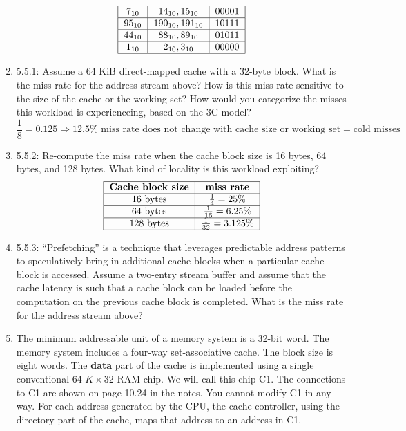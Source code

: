 \documentclass[10pt,letterpaper]{article}
\begin{document}
\begin{enumerate}[label=\textbf{Problem \arabic*.}]
\[\begin{tabular} {|c|c|c|}
	\hline
	$7_{10}$ & $14_{10},15_{10}$ & 00001 \\ 
	\hline
	$95_{10}$ & $190_{10},191_{10}$ & 10111 \\ 
	\hline
	$44_{10}$ & $88_{10},89_{10}$ & 01011 \\ 
	\hline
	$1_{10}$ & $2_{10},3_{10}$ & 00000 \\ 
	\hline
	\end{tabular}\]
\item 5.5.1: Assume a 64 KiB direct-mapped cache with a 32-byte block. What is the miss rate for the address stream above? How is this miss rate sensitive to the size of the cache or the working set? How would you categorize the misses this workload is experienceing, based on the 3C model?
\[\boxed{\frac{1}{8}=0.125 \Rightarrow 12.5\% \text{ miss rate does not change with cache size or working set} = \text{cold misses}}\]
\item 5.5.2: Re-compute the miss rate when the cache block size is 16 bytes, 64 bytes, and 128 bytes. What kind of locality is this workload exploiting?
	\[\begin{tabular} {|c|c|}
	\hline
	\textbf{Cache block size} & \textbf{miss rate} \\ 
	\hline
	16 bytes & $\frac{1}{4}=25\%$ \\
	\hline
	64 bytes & $\frac{1}{16}=6.25\%$\\
	\hline
	128 bytes & $\frac{1}{32}=3.125\%$\\
	\hline
	\end{tabular}\]
\item 5.5.3: ``Prefetching'' is a technique that leverages predictable address patterns to speculatively bring in additional cache blocks when a particular cache block is accessed. Assume a two-entry stream buffer and assume that the cache latency is such that a cache block can be loaded before the computation on the previous cache block is completed. What is the miss rate for the address stream above?\\
\item The minimum addressable unit of a memory system is a 32-bit word. The memory system includes a four-way set-associative cache. The block size is eight words. The \textbf{data} part of the cache is implemented using a single conventional 64 $K \times 32$ RAM chip. We will call this chip C1. The connections to C1 are shown on page 10.24 in the notes. You cannot modify C1 in any way. For each address generated by the CPU, the cache controller, using the directory part of the cache, maps that address to an address in C1.

\end{enumerate}
\end{document}
